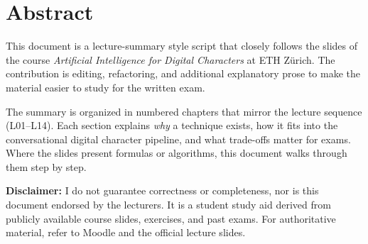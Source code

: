 \chapter*{Abstract}

This document is a lecture-summary style script that closely follows the slides of the course \emph{Artificial Intelligence for Digital Characters} at ETH Z\"urich. The contribution is editing, refactoring, and additional explanatory prose to make the material easier to study for the written exam.

The summary is organized in numbered chapters that mirror the lecture sequence (L01--L14). Each section explains \emph{why} a technique exists, how it fits into the conversational digital character pipeline, and what trade-offs matter for exams. Where the slides present formulas or algorithms, this document walks through them step by step.

\textbf{Disclaimer:} I do not guarantee correctness or completeness, nor is this document endorsed by the lecturers. It is a student study aid derived from publicly available course slides, exercises, and past exams. For authoritative material, refer to Moodle and the official lecture slides.

\tableofcontents
\newpage
